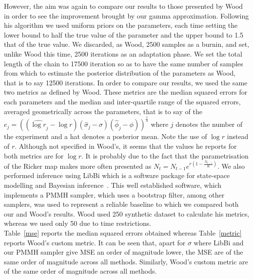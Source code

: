 \documentclass{article}
\begin{document}
	However, the aim was again to compare our results to those presented by Wood in order to see the improvement brought by our gamma approximation. Following his algorithm we used uniform priors on the parameters, each time setting the lower bound to half the true value of the parameter and the upper bound to 1.5 that of the true value. We discarded, as Wood, 2500 samples as a burnin, and set, unlike Wood this time, 2500 iterations as an adaptation phase. We set the total length of the chain to 17500 iteration so as to have the same number of samples from which to estimate the posterior distribution of the parameters as Wood, that is to say 12500 iterations. In order to compare our results, we used the same two metrics as defined by Wood. These metrics are the median squared errors for each parameters and the median and inter-quartile range of the squared errors, averaged geometrically across the parameters, that is to say of the $e_j = ((\hat{\log r}_j-\log r)(\hat{\sigma}_j-\sigma)(\hat{\phi}_j-\phi))^\frac{1}{3}$ where $j$ denotes the number of the experiment and a hat denotes a posterior mean. Note the use of $\log r$ instead of $r$. Although not specified in Wood's, it seems that the values he reports for both metrics are for $\log r$. It is probably due to the fact that the parametrisation of the Ricker map makes more often presented as $N_t = N_{t-1}e^{r(1-\frac{N_{t-1}}{K})}$. We also performed inference using LibBi which is a software package for state-space modelling and Bayesian inference~\cite{murray2013bayesian}. This well established software, which implements a PMMH sampler, which uses a bootstrap filter, among other samplers, was used to represent a reliable baseline to which we compared both our and Wood's results. Wood used 250 synthetic dataset to calculate his metrics, whereas we used only 50 due to time restrictions. \\
	Table~\ref{mse} reports the median squared errors obtained whereas Table~\ref{metric} reports Wood's custom metric. It can be seen that, apart for $\sigma$ where LibBi and our PMMH sampler give MSE an order of magnitude lower, the MSE are of the same order of magnitude across all methods. Similarly, Wood's custom metric are of the same order of magnitude across all methods.
	
	
	
\end{document}

